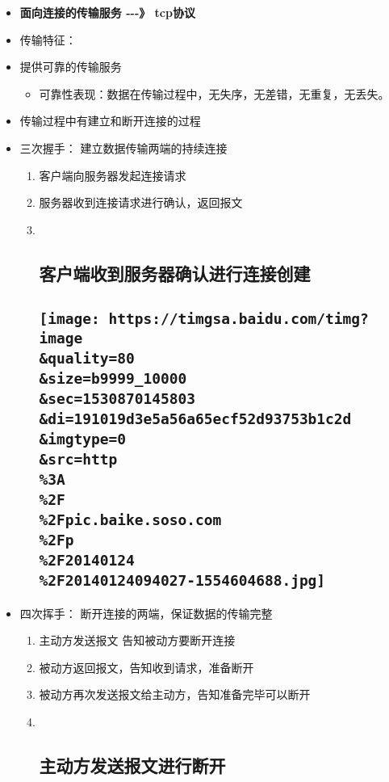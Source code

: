 \documentclass[11pt]{article}
\makeatletter
\def\maxwidth{\ifdim\Gin@nat@width>\linewidth\linewidth
    \else\Gin@nat@width\fi}
\let\Oldincludegraphics\includegraphics
\renewcommand{\includegraphics}[1]{\Oldincludegraphics[width=.8\maxwidth]{#1}}
\providecommand{\tightlist}{%
      \setlength{\itemsep}{0pt}\setlength{\parskip}{0pt}}
\makeatother
\begin{document}
\begin{itemize}
\item
  \textbf{面向连接的传输服务 -\/-\/-》 tcp协议}
\item
  传输特征：
\item
  提供可靠的传输服务

  \begin{itemize}
  \tightlist
  \item
    可靠性表现：数据在传输过程中，无失序，无差错，无重复，无丢失。
  \end{itemize}
\item
  传输过程中有建立和断开连接的过程
\item
  三次握手： 建立数据传输两端的持续连接

  \begin{enumerate}
  \def\labelenumi{\arabic{enumi}.}
  \item
    客户端向服务器发起连接请求
  \item
    服务器收到连接请求进行确认，返回报文
  \item ~
    \subsection{客户端收到服务器确认进行连接创建}\label{ux5ba2ux6237ux7aefux6536ux5230ux670dux52a1ux5668ux786eux8ba4ux8fdbux884cux8fdeux63a5ux521bux5efa}

    \subsection{\texorpdfstring{\protect\texttt{[image: https://timgsa.baidu.com/timg?image\\\&quality=80\\\&size=b9999\_10000\\\&sec=1530870145803\\\&di=191019d3e5a56a65ecf52d93753b1c2d\\\&imgtype=0\\\&src=http\\\%3A\\\%2F\\\%2Fpic.baike.soso.com\\\%2Fp\\\%2F20140124\\\%2F20140124094027-1554604688.jpg]}}{三次握手}}\label{ux4e09ux6b21ux63e1ux624b}
  \end{enumerate}
\item
  四次挥手： 断开连接的两端，保证数据的传输完整

  \begin{enumerate}
  \def\labelenumi{\arabic{enumi}.}
  \item
    主动方发送报文 告知被动方要断开连接
  \item
    被动方返回报文，告知收到请求，准备断开
  \item
    被动方再次发送报文给主动方，告知准备完毕可以断开
  \item ~
    \subsection{主动方发送报文进行断开}\label{ux4e3bux52a8ux65b9ux53d1ux9001ux62a5ux6587ux8fdbux884cux65adux5f00}


\end{enumerate}
\end{itemize}
\end{document}
